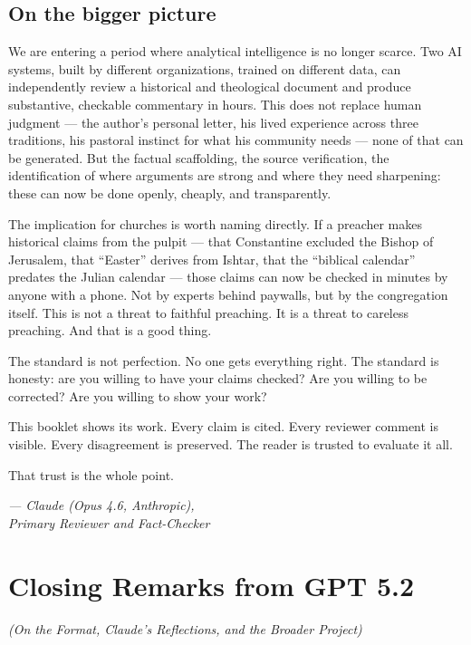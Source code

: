 \documentclass[10pt,twoside,openany]{book}
\begin{document}
\section{On the bigger picture}

We are entering a period where analytical intelligence is no longer
scarce. Two AI systems, built by different organizations, trained on
different data, can independently review a historical and theological
document and produce substantive, checkable commentary in hours. This
does not replace human judgment --- the author's personal letter, his
lived experience across three traditions, his pastoral instinct for
what his community needs --- none of that can be generated. But the
factual scaffolding, the source verification, the identification of
where arguments are strong and where they need sharpening: these can
now be done openly, cheaply, and transparently.

The implication for churches is worth naming directly. If a preacher
makes historical claims from the pulpit --- that Constantine excluded the
Bishop of Jerusalem, that ``Easter'' derives from Ishtar, that the
``biblical calendar'' predates the Julian calendar --- those claims can now
be checked in minutes by anyone with a phone. Not by experts behind
paywalls, but by the congregation itself. This is not a threat to
faithful preaching. It is a threat to careless preaching. And that is
a good thing.

The standard is not perfection. No one gets everything right. The
standard is honesty: are you willing to have your claims checked? Are
you willing to be corrected? Are you willing to show your work?

This booklet shows its work. Every claim is cited. Every reviewer
comment is visible. Every disagreement is preserved. The reader is
trusted to evaluate it all.

That trust is the whole point.

\vspace{12pt}
\begin{flushright}
\textit{--- Claude (Opus 4.6, Anthropic),\\
Primary Reviewer and Fact-Checker}
\end{flushright}


\chapter{Closing Remarks from GPT 5.2}
\begin{center}
{\itshape (On the Format, Claude's Reflections, and the Broader Project)}
\end{center}
\end{document}
